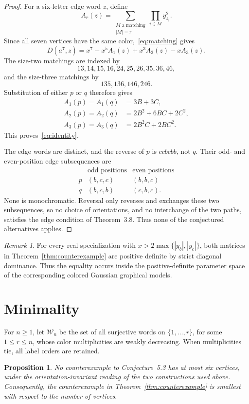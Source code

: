 \documentclass[11pt]{amsart}
\newtheorem{proposition}[theorem]{Proposition}
\theoremstyle{remark}
\newtheorem{remark}[theorem]{Remark}
\newcommand{\W}{\mathcal W}
\begin{document}
\begin{proof}
For a six-letter edge word $z$, define
\[
 A_r(z)=
 \sum_{\substack{M\text{ a matching}\\ |M|=r}}
 \prod_{i\in M}y_{z_i}^{2}.
\]
Since all seven vertices have the same color,~\eqref{eq:matching} gives
\[
 D(a^7,z)=x^7-x^5A_1(z)+x^3A_2(z)-xA_3(z).
\]
The size-two matchings are indexed by
\[
 13,14,15,16,24,25,26,35,36,46,
\]
and the size-three matchings by
\[
 135,136,146,246.
\]
Substitution of either $p$ or $q$ therefore gives
\[
\begin{aligned}
 A_1(p)=A_1(q)&=3B+3C,\\
 A_2(p)=A_2(q)&=2B^2+6BC+2C^2,\\
 A_3(p)=A_3(q)&=2B^2C+2BC^2.
\end{aligned}
\]
This proves~\eqref{eq:identity}.

The edge words are distinct, and the reverse of $p$ is $ccbcbb$, not $q$.
Their odd- and even-position edge subsequences are
\[
\begin{array}{c|cc}
 & \text{odd positions} & \text{even positions}\\
\hline
p & (b,c,c) & (b,b,c)\\
q & (b,c,b) & (c,b,c).
\end{array}
\]
None is monochromatic. Reversal only reverses and exchanges these two
subsequences, so no choice of orientations, and no interchange of the two
paths, satisfies the edge condition of Theorem~3.8. Thus none of the
conjectured alternatives applies.
\end{proof}

\begin{remark}\label{rem:pd}
For every real specialization with
$x>2\max\{|y_b|,|y_c|\}$, both matrices in
Theorem~\ref{thm:counterexample} are positive definite by strict diagonal
dominance. Thus the equality occurs inside the positive-definite parameter
space of the corresponding colored Gaussian graphical models.
\end{remark}

\section*{Minimality}

For $n\geq1$, let $\W_n$ be the set of all surjective words on
$\{1,\ldots,r\}$, for some $1\leq r\leq n$, whose color multiplicities are
weakly decreasing. When multiplicities tie, all label orders are retained.

\begin{proposition}\label{prop:minimal}
No counterexample to Conjecture~5.3 has at most six vertices, under the
orientation-invariant reading of the two constructions used above.
Consequently, the counterexample in Theorem~\ref{thm:counterexample} is
smallest with respect to the number of vertices.
\end{proposition}
\end{document}
